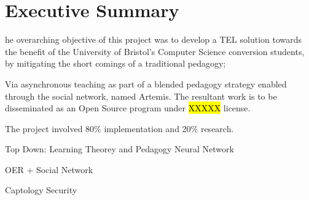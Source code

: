 %
%
%

\chapter*{Executive Summary}
\begin{SingleSpace}
he overarching objective of this project was to develop a TEL solution towards the benefit of the University of Bristol's Computer Science conversion students, by mitigating the short comings of a traditional pedagogy; 




Via asynchronous teaching as part of a blended pedagogy strategy enabled through the social network, named Artemis. The resultant work is to be disseminated as an Open Source program under \hl{XXXXX} license.

The project involved 80\% implementation and 20\% research. 

Top Down:
Learning Theorey and Pedagogy
Neural Network

OER + Social Network

Captology
Security





\end{SingleSpace}
\clearpage